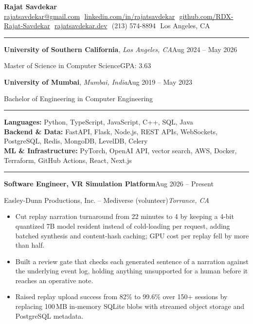 \documentclass[a4paper,10pt]{article}
\newcommand{\subtletext}[1]{\textcolor{subtle}{#1}}
\newenvironment{tightlist}{%
  \begin{itemize}[itemsep=0.16em, topsep=0.10em, leftmargin=1.4em, rightmargin=0pt, parsep=0pt, partopsep=0pt]
}{%
  \end{itemize}%
}
\newcommand{\headstrut}{\rule[-0.32\baselineskip]{0pt}{0.78\baselineskip}}
\newcommand{\workentry}[5]{%
  \vspace{0.4em}%
  \noindent\headstrut\textbf{#1}\hfill #2\\%
  \headstrut\subtletext{#3}\hfill\textit{#4}\par
  \vspace{-0.05em}\begin{tightlist}#5\end{tightlist}\vspace{0.15em}%
}
\newcommand{\eduentry}[6]{%
  \vspace{0.15em}%
  \noindent\headstrut\textbf{#1}, \textit{#4}\hfill #2\\%
  \headstrut\subtletext{#3}\hfill\subtletext{#5}\par
  \ifblank{#6}{}{\headstrut\subtletext{Coursework: #6}\par}%
  \vspace{0.15em}%
}
\newcommand{\mysection}[1]{%
  \vspace{0.45em}\noindent{\large\bfseries #1}\vspace{-0.85em}\par\noindent\rule{\linewidth}{0.6pt}\par%
  \vspace{-0.2em}
}
\newcommand{\dropname}[4]{%
  \textbf{{\Huge #1}{\huge #2}\hspace{0.2em} {\Huge #3}{\huge #4}}%
}
\begin{document}
\pagestyle{empty}

\begin{center}
  \dropname{R}{ajat}{S}{avdekar} \\[0.35em]
  \newcommand{\sep}{\,\textbar\,}
  \href{mailto:rajatsavdekar@gmail.com}{rajatsavdekar@gmail.com}\sep
  \href{https://www.linkedin.com/in/rajatsavdekar/}{linkedin.com/in/rajatsavdekar}\sep
  \href{https://github.com/RDX-Rajat-Savdekar/}{github.com/RDX-Rajat-Savdekar}\sep
  \href{https://rajatsavdekar.dev/}{rajatsavdekar.dev}\sep
  (213) 574-8894\sep
  Los Angeles, CA\\[0.3em]
  \vspace{-1em}
\end{center}

\mysection{EDUCATION}
\eduentry
  {University of Southern California}
  {Aug 2024 -- May 2026}
  {Master of Science in Computer Science}
  {Los Angeles, CA}
  {GPA: 3.63}
  {}

\eduentry
  {University of Mumbai}
  {Aug 2019 -- May 2023}
  {Bachelor of Engineering in Computer Engineering}
  {Mumbai, India}
  {}
  {}

\mysection{SKILLS}
\vspace{0.1em}
\noindent\textbf{Languages:} Python, TypeScript, JavaScript, C++, SQL, Java\\[0.15em]
\noindent\textbf{Backend \& Data:} FastAPI, Flask, Node.js, REST APIs, WebSockets, PostgreSQL, Redis, MongoDB, LevelDB, Celery\\[0.15em]
\noindent\textbf{ML \& Infrastructure:} PyTorch, OpenAI API, vector search, AWS, Docker, Terraform, GitHub Actions, React, Next.js

\mysection{EXPERIENCE}

\workentry
  {Software Engineer, VR Simulation Platform}
  {Aug 2026 -- Present}
  {Easley-Dunn Productions, Inc. -- Mediverse (volunteer)}
  {Torrance, CA}
{
  \item Cut replay narration turnaround from 22 minutes to 4 by keeping a 4-bit quantized 7B model resident instead of cold-loading per request, adding batched synthesis and content-hash caching; GPU cost per replay fell by more than half.
  \item Built a review gate that checks each generated sentence of a narration against the underlying event log, holding anything unsupported for a human before it reaches an operative note.
  \item Raised replay upload success from 82\% to 99.6\% over 150+ sessions by replacing 100\,MB in-memory SQLite blobs with streamed object storage and PostgreSQL metadata.
}
\end{document}
